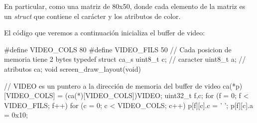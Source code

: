 \documentclass[]{scrartcl}
\begin{document}
\begin{center}
  \noindent {}
  \label{fig:videobuffer02}
\end{center}

En particular, como una matriz de 80x50, donde cada elemento de la matriz es un \textit{struct} que contiene el carácter y los atributos de color. 

\begin{center}
  \noindent {}
  \label{fig:videobuffer03}
\end{center}

El código que veremos a continuación inicializa el buffer de video:

\begin{cbox}[]{}
  #define VIDEO_COLS 80
  #define VIDEO_FILS 50
  // Cada posicion de memoria tiene 2 bytes
  typedef struct ca_s {
    uint8_t c; // caracter
    uint8_t a; // atributos
  } ca;
  void screen_draw_layout(void) {

    // VIDEO es un puntero a la dirección de memoria del buffer de video
    ca(*p)[VIDEO_COLS] = (ca(*)[VIDEO_COLS])VIDEO;
    uint32_t f,c;
    for (f = 0; f <  VIDEO_FILS; f++) {
      for (c = 0; c < VIDEO_COLS; c++) {
        p[f][c].c = ' ';
        p[f][c].a = 0x10;
      }
    }
  }
\end{cbox}
\end{document}
